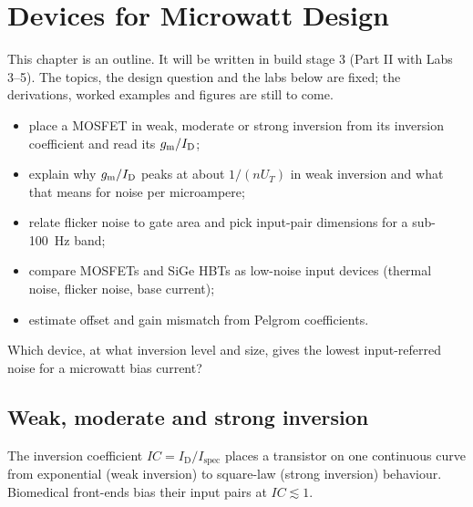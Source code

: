 \chapter{Devices for Microwatt Design}\label{ch:devices}

\begin{specnote}
This chapter is an outline. It will be written in build stage 3 (Part II with Labs 3--5). The topics, the design question and the labs below are fixed; the derivations, worked examples and figures are still to come.
\end{specnote}

\begin{objectives}
\begin{itemize}
  \item place a MOSFET in weak, moderate or strong inversion from its inversion coefficient and read its $g_\mathrm{m}/I_\mathrm{D}$;
  \item explain why $g_\mathrm{m}/I_\mathrm{D}$ peaks at about $1/(n U_T)$ in weak inversion and what that means for noise per microampere;
  \item relate flicker noise to gate area and pick input-pair dimensions for a sub-\qty{100}{\hertz} band;
  \item compare \sgx{} MOSFETs and SiGe HBTs as low-noise input devices (thermal noise, flicker noise, base current);
  \item estimate offset and gain mismatch from Pelgrom coefficients.
\end{itemize}
\end{objectives}

\begin{insight}
Which device, at what inversion level and size, gives the lowest input-referred noise for a microwatt bias current?
\end{insight}

\section{Weak, moderate and strong inversion}\label{sec:ch5-1}
The inversion coefficient $IC = I_\mathrm{D}/I_\mathrm{spec}$ places a transistor on one continuous curve from exponential (weak inversion) to square-law (strong inversion) behaviour. Biomedical front-ends bias their input pairs at $IC \lesssim 1$.

